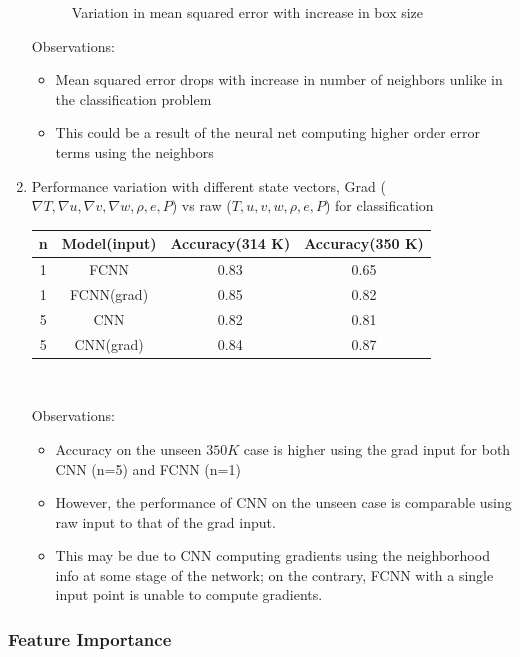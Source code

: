 \documentclass{article}
\begin{document}
\begin{enumerate}
\begin{figure}
        \caption{Variation in mean squared error with increase in box size}
        \label{fig:nreg}
    \end{figure}
    Observations:
    \begin{itemize}
        \item Mean squared error drops with increase in number of neighbors unlike in the classification problem
        \item This could be a result of the neural net computing higher order error terms using the neighbors
    \end{itemize}
    \item Performance variation with different state vectors, Grad ($\nabla T, \nabla u, \nabla v, \nabla w, \rho, e, P$) vs raw ($T, u, v, w, \rho, e, P$) for classification \\
    \begin{center}
        	\begin{tabular}{ |c|c|c|c| } 
    			\hline
    			n & Model(input) & Accuracy(314 K) & Accuracy(350 K)\\ 
    			\hline
    			1 & FCNN\color{red}{(raw)} & \color{red}0.83 & \color{red}0.65\\ 
    			1 &  FCNN(grad) & 0.85 & 0.82 \\ 
    			5 &  CNN\color{red}{(raw)} & \color{red}0.82 & \color{red}0.81 \\
    			5 &  CNN(grad) & 0.84 & 0.87 \\
    			\hline
    		\end{tabular} \\
    \end{center}
    Observations:
    \begin{itemize}
        \item Accuracy on the unseen $350 K$ case is higher using the grad input for both CNN (n=5) and FCNN (n=1)
        \item However, the performance of CNN on the unseen case is comparable using raw input to that of the grad input.
        \item This may be due to CNN computing gradients using the neighborhood info at some stage of the network; on the contrary, FCNN with a single input point is unable to compute gradients. 
    \end{itemize}
\end{enumerate}

\subsubsection{Feature Importance}
\end{document}
